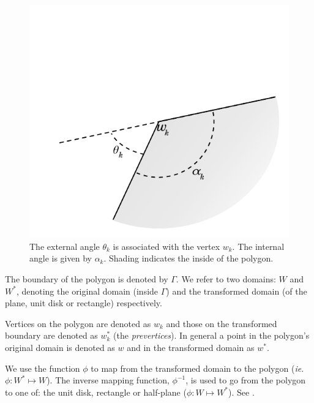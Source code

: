 \begin{figure} [bp]
\centering
\includegraphics[scale=0.6]{sc/figs/anglediagram.pdf}
\caption{The external angle $\theta_k$ is associated with the vertex $w_k$. The internal angle is given by $\alpha_k$. Shading indicates the inside of the polygon.}
\label{anglediagram}
\end{figure}

The boundary of the polygon is denoted by $\Gamma$. We refer to two domains: $W$ and $W^*$, denoting the original domain (inside $\Gamma$) and the transformed domain (of the plane, unit disk or rectangle) respectively. 

Vertices on the polygon are denoted as $w_k$ and those on the transformed boundary are denoted as $w^*_k$ (the \emph{prevertices}). In general a point in the polygon's original domain is denoted as $w$ and in the transformed domain as $w^*$.

We use the function $\phi$ to map from the transformed domain to the polygon (\emph{ie.} $\phi:W^* \mapsto W$). The inverse mapping function, $\phi^{-1}$, is used to go from the polygon to one of: the unit disk, rectangle or half-plane ($\phi:W \mapsto W^*$).  See .

